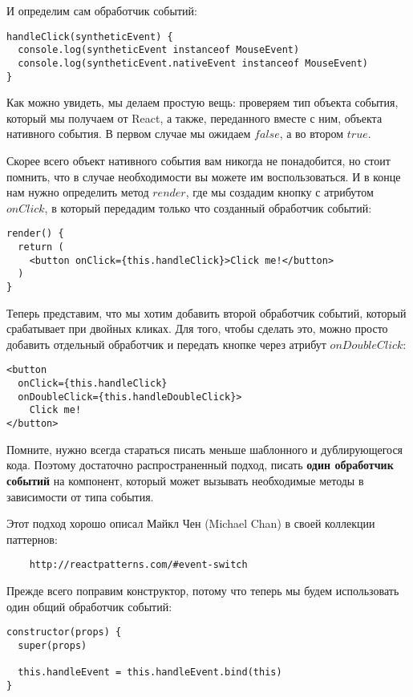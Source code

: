 И определим сам обработчик событий:

\begin{lstlisting}
handleClick(syntheticEvent) {
  console.log(syntheticEvent instanceof MouseEvent)
  console.log(syntheticEvent.nativeEvent instanceof MouseEvent)
}
\end{lstlisting}

Как можно увидеть, мы делаем простую вещь: проверяем тип объекта события, который мы получаем от React, а также, переданного вместе с ним, объекта нативного события. В первом случае мы ожидаем $false$, а во втором $true$.

Скорее всего объект нативного события вам никогда не понадобится, но стоит помнить, что в случае необходимости вы можете им воспользоваться. И в конце нам нужно определить метод $render$, где мы создадим кнопку с атрибутом $onClick$, в который передадим только что созданный обработчик событий:

\begin{lstlisting}
render() {
  return (
    <button onClick={this.handleClick}>Click me!</button>
  )
}
\end{lstlisting}

Теперь представим, что мы хотим добавить второй обработчик событий, который срабатывает при двойных кликах. Для того, чтобы сделать это, можно просто добавить отдельный обработчик и передать кнопке через атрибут $onDoubleClick$:

\begin{lstlisting}
<button
  onClick={this.handleClick}
  onDoubleClick={this.handleDoubleClick}>
    Click me!
</button>
\end{lstlisting} 

Помните, нужно всегда стараться писать меньше шаблонного и дублирующегося кода. Поэтому достаточно распространенный подход, писать \textbf{один обработчик событий} на компонент, который может вызывать необходимые методы в зависимости от типа события.

Этот подход хорошо описал Майкл Чен (Michael Chan) в своей коллекции паттернов:

\begin{lstlisting}
	http://reactpatterns.com/#event-switch
\end{lstlisting}

Прежде всего поправим конструктор, потому что теперь мы будем использовать один общий обработчик событий:

\begin{lstlisting}
constructor(props) {
  super(props)
     
  this.handleEvent = this.handleEvent.bind(this)
}
\end{lstlisting}

